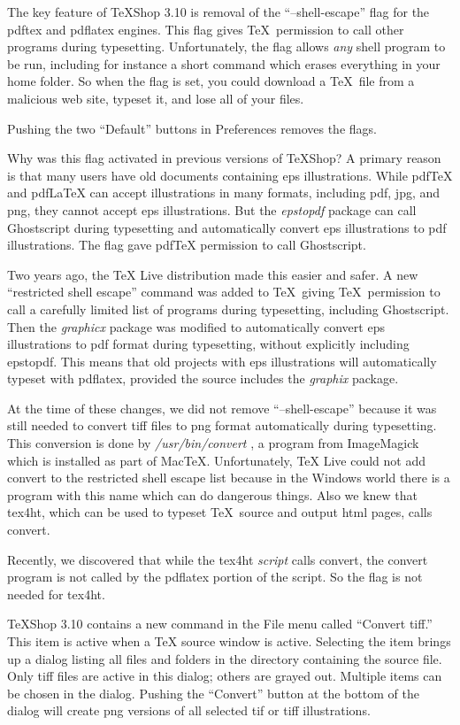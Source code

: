 \documentclass[11pt, oneside]{amsart}
\begin{document}
The key feature of TeXShop 3.10 is removal of the ``--shell-escape'' flag for the pdftex and pdflatex engines. This flag gives \TeX\  permission to
call other programs during typesetting. Unfortunately, the flag allows {\em any} shell program to be run, including for instance a short command which erases everything in your home folder. So when the flag is set, you could download a \TeX\ file from a malicious web site, typeset it, and lose all of your files.

Pushing the two ``Default'' buttons in Preferences removes the flags.

Why was this flag activated in previous versions of TeXShop? A primary reason is that many users have old documents containing eps illustrations. While pdfTeX
and pdfLaTeX can accept illustrations in many formats, including pdf, jpg, and png, they cannot accept eps illustrations. But the {\em epstopdf} package can call  Ghostscript during typesetting and automatically convert eps illustrations to pdf illustrations. The flag gave pdfTeX permission to call Ghostscript.

Two years ago, the TeX Live distribution made this easier and safer. A new ``restricted shell escape'' command was added to \TeX\ giving \TeX\ permission to call a carefully limited list of programs during typesetting, including Ghostscript. Then the {\em graphicx} package was modified to automatically convert eps illustrations to pdf format during typesetting, without explicitly including epstopdf. This means that old projects with eps illustrations will automatically typeset with pdflatex, provided the source includes the {\em graphix} package. 

At the time of these changes, we did not remove ``--shell-escape'' because it was still needed to convert tiff files to png format automatically during typesetting. This conversion is done by {\em /usr/bin/convert} , a program from ImageMagick which is installed as part of MacTeX. Unfortunately, TeX Live could not add convert to the restricted
shell escape list because in the Windows world there is a program with this name which can do dangerous things. Also we knew that tex4ht, which can be used to typeset \TeX\ source and output html pages, calls convert.

Recently, we discovered that while the tex4ht {\em script} calls convert, the convert program is not called by the pdflatex portion of the script. So the flag is not needed for
tex4ht. 

TeXShop 3.10 contains a new command in the File menu called ``Convert tiff.'' This item is active when a TeX source window is active. Selecting the item brings up a  dialog listing all files and folders in the
directory containing the source file. Only tiff files are active in this dialog; others are grayed out. Multiple items can be chosen in the dialog. Pushing the  ``Convert''
button at the bottom of the dialog will create png versions of all selected tif or tiff illustrations. 
\end{document}
